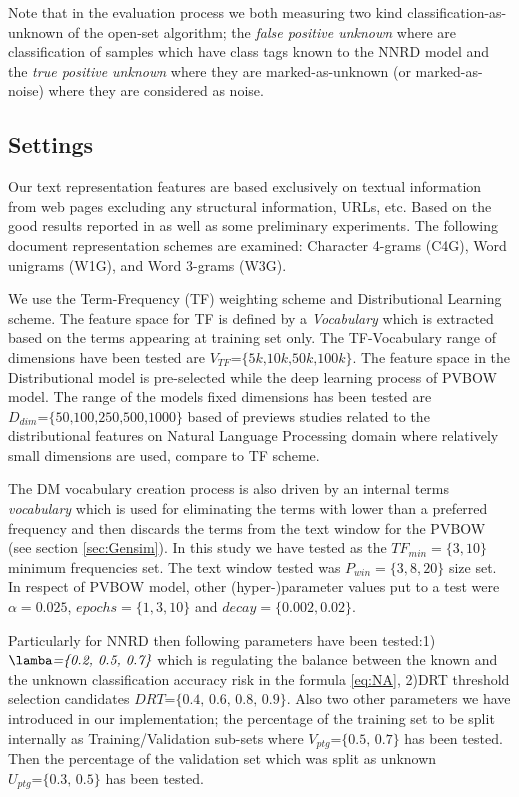 \documentclass[runningheads]{llncs}
\begin{document}
Note that in the evaluation process we both measuring two kind classification-as-unknown of the open-set algorithm; the \textit{false positive unknown} where are classification of samples which have class tags known to the NNRD model and the \textit{true positive unknown} where they are marked-as-unknown (or marked-as-noise) where they are considered as noise.

\subsection{Settings}\label{sec:evaluation_measures}
Our text representation features are based exclusively on textual information from web pages excluding any structural information, URLs, etc. Based on the good results reported in \citep{sharoff2010web,pritsos2013open,Asheghi2015} as well as some preliminary experiments. The following document representation schemes are examined: Character 4-grams (C4G), Word unigrams (W1G), and Word 3-grams (W3G).

We use the Term-Frequency (TF) weighting scheme and Distributional Learning scheme. The feature space for TF is defined by a \textit{Vocabulary} which is extracted based on the terms appearing at training set only. The TF-Vocabulary range of dimensions have been tested are $V_{TF}\textit{=\{5k,10k,50k,100k\}}$. The feature space in the Distributional model is pre-selected while the deep learning process of PVBOW model. The range of the models fixed dimensions has been tested are $D_{dim}\textit{=\{50,100,250,500,1000\}}$ based of previews studies related to the distributional features on Natural Language Processing domain where relatively small dimensions are used, compare to TF scheme.

The DM vocabulary creation process is also driven by an internal terms \textit{vocabulary} which is used for eliminating the terms with lower than a preferred frequency and then discards the terms from the text window for the PVBOW (see section \ref{sec:Gensim}). In this study we have tested as the $TF_{min}=\{3,10\}$ minimum frequencies set. The text window tested was $P_{win}=\{3,8,20\}$ size set. In respect of PVBOW model, other (hyper-)parameter values put to a test were $\alpha=0.025$, $epochs=\{1, 3, 10\}$ and $decay=\{0.002, 0.02\}$.

Particularly for NNRD then following parameters have been tested:1) $\lamba\textit{=\{0.2, 0.5, 0.7\}}$ which is regulating the balance between the known and the unknown classification accuracy risk in the formula \ref{eq:NA}, 2)DRT threshold selection candidates $DRT\textit{=\{0.4, 0.6, 0.8, 0.9\}}$. Also two other parameters we have introduced in our implementation; the percentage of the training set to be split internally as Training/Validation sub-sets where $V_{ptg}\textit{=\{0.5, 0.7\}}$ has been tested. Then the percentage of the validation set which was split as unknown $U_{ptg}\textit{=\{0.3, 0.5\}}$ has been tested.
\end{document}
